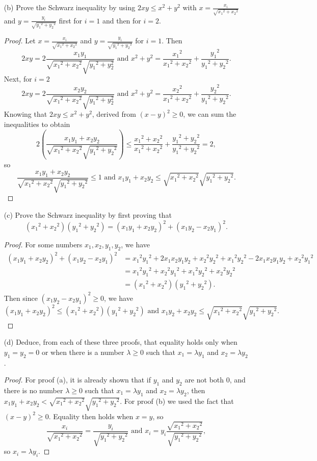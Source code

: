 \documentclass{article}
\begin{document}
\begin{enumerate}
\begin{proof}
	\end{proof}
	\pagebreak
	\item[(b)] Prove the Schwarz inequality by using $2xy \le x^2 + y^2$ with $x = \frac{x_i}{\sqrt{{x_1}^2 + {x_2}^2}}$ and $y = \frac{y_i}{\sqrt{{y_1}^2 + {y_2}^2}}$ first for $i = 1$ and then for $i = 2$.
	\begin{proof}
		Let $x = \frac{x_i}{\sqrt{{x_1}^2 + {x_2}^2}}$ and $y = \frac{y_i}{\sqrt{{y_1}^2 + {y_2}^2}}$ for $i=1$. Then \[2xy = 2 \frac{x_1y_1}{\sqrt{{x_1}^2 + {x_2}^2}\sqrt{{y_1}^2 + {y_2^2}}} \text{ and } x^2 + y^2 = \frac{{x_1}^2}{{x_1}^2 + {x_2}^2} + \frac{{y_1}^2}{{y_1}^2 + {y_2}^2}.\] Next, for $i=2$ \[2xy = 2 \frac{x_2y_2}{\sqrt{{x_1}^2 + {x_2}^2}\sqrt{{y_1}^2 + {y_2^2}}} \text{ and } x^2 + y^2 = \frac{{x_2}^2}{{x_1}^2 + {x_2}^2} + \frac{{y_2}^2}{{y_1}^2 + {y_2}^2}.\] Knowing that $2xy \le x^2 + y^2$, derived from $(x - y)^2 \ge 0$, we can sum the inequalities to obtain \[ 2(\frac{x_1y_1 + x_2y_2}{\sqrt{{x_1}^2 + {x_2}^2}\sqrt{{y_1}^2 + {y_2}^2}}) \le \frac{{x_1}^2 + {x_2}^2}{{x_1}^2 + {x_2}^2} + \frac{{y_1}^2 + {y_2}^2}{{y_1}^2 + {y_2}^2} = 2, \] so \[ \frac{x_1y_1 + x_2y_2}{\sqrt{{x_1}^2 + {x_2}^2}\sqrt{{y_1}^2 + {y_2}^2}} \le 1 \text{ and } x_1y_1 + x_2y_2 \le \sqrt{{x_1}^2 + {x_2}^2}\sqrt{{y_1}^2 + {y_2}^2}.\]
	\end{proof}
	\item[(c)] Prove the Schwarz inequality by first proving that \[ ({x_1}^2 + {x_2}^2)({y_1}^2 + {y_2}^2) = (x_1y_1 + x_2y_2)^2 + (x_1y_2 - x_2y_1)^2. \]
	\begin{proof}
		For some numbers $x_1, x_2, y_1, y_2$, we have
		\begin{align*}
			(x_1y_1 + x_2y_2)^2 + (x_1y_2 - x_2y_1)^2 &= {x_1}^2{y_1}^2 + 2x_1x_2y_1y_2 + {x_2}^2{y_2}^2 + {x_1}^2{y_2}^2 - 2x_1x_2y_1y_2 + {x_2}^2{y_1}^2 \\&= {x_1}^2{y_1}^2 + {x_2}^2{y_1}^2 + {x_1}^2{y_2}^2 + {x_2}^2{y_2}^2 \\&= ({x_1}^2 + {x_2}^2)({y_1}^2 + {y_2}^2).
		\end{align*}
		Then since $(x_1y_2 - x_2y_1)^2 \ge 0$, we have \[ (x_1y_1 + x_2y_2)^2 \le ({x_1}^2 + {x_2}^2)({y_1}^2 + {y_2}^2) \text{ and } x_1y_2 + x_2y_2 \le \sqrt{{x_1}^2 + {x_2}^2}\sqrt{{y_1}^2 + {y_2}^2}. \]
	\end{proof}
	\item[(d)] Deduce, from each of these three proofs, that equality holds only when $y_1 = y_2 = 0$ or when there is a number $\lambda \ge 0$ such that $x_1 = \lambda y_1$ and $x_2 = \lambda y_2$.
	\begin{proof}
		For proof (a), it is already shown that if $y_1$ and $y_2$ are not both 0, and there is no number $\lambda \ge 0$ such that $x_1 = \lambda y_1$ and $x_2 = \lambda y_2$, then $x_1y_1 + x_2y_2 < \sqrt{{x_1}^2 + {x_2}^2}\sqrt{{y_1}^2 + {y_2}^2}$.
		For proof (b) we used the fact that $(x - y)^2 \ge 0$. Equality then holds when $x = y$, so \[ \frac{x_i}{\sqrt{{x_1}^2 + {x_2}^2}} = \frac{y_i}{\sqrt{{y_1}^2 + {y_2}^2}} \text{ and } x_i = y_i\frac{\sqrt{{x_1}^2 + {x_2}^2}}{\sqrt{{y_1}^2 + {y_2}^2}}, \] so $x_i = \lambda y_i$.


\end{proof}
\end{enumerate}
\end{document}

